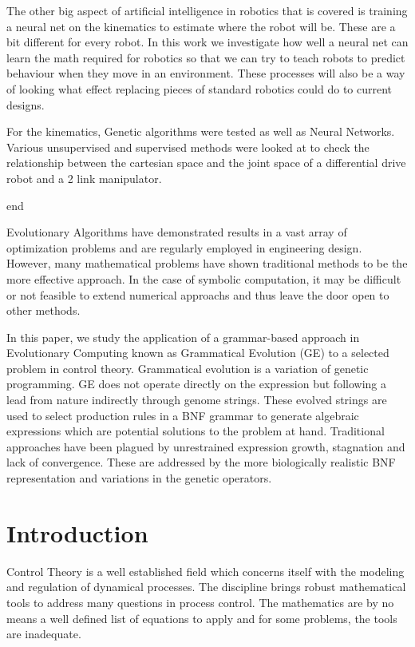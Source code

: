 \documentclass[12pt]{article}
\begin{document}
The other big aspect of artificial intelligence in robotics that is covered is training a neural net on the kinematics to estimate where the robot will be. These are a bit different for every robot. In this work we investigate how well a neural net can learn the math required for robotics so that we can try to teach robots to predict behaviour when they move in an environment. These processes will also be a way of looking what effect replacing pieces of standard robotics could do to current designs.

For the kinematics, Genetic algorithms were tested as well as Neural Networks. Various unsupervised and supervised methods were looked at to check the relationship between the cartesian space and the joint space of a differential drive robot and a 2 link manipulator. 

end


Evolutionary Algorithms have demonstrated results in a vast array of
optimization problems and are regularly employed in engineering
design.  However, many mathematical problems have shown traditional
methods to be the more effective approach.  In the case of symbolic
computation, it may be difficult or not feasible to extend 
numerical approachs and thus leave the door open to other methods.

In this paper, we study the application of a 
grammar-based approach in Evolutionary Computing known as Grammatical
Evolution (GE) to a selected problem in control theory.  Grammatical
evolution is a variation of genetic programming.  GE does not operate
directly on the expression but following a lead from nature indirectly
through genome strings.  These evolved strings are used to select
production rules in a BNF grammar to generate algebraic expressions
which are potential solutions to the problem at hand. Traditional
approaches have been plagued by unrestrained expression growth,
stagnation and lack of convergence.  These are addressed by the more
biologically realistic BNF representation and variations in the
genetic operators.  


\newpage
\setcounter{page}{1} 

\section{Introduction}

Control Theory is a well established field which concerns itself
with the modeling and regulation of dynamical processes.  The discipline
brings robust mathematical tools to address many questions in process
control.  The mathematics are by no means a well defined list of
equations to apply and for some problems, the tools are inadequate.
\end{document}
